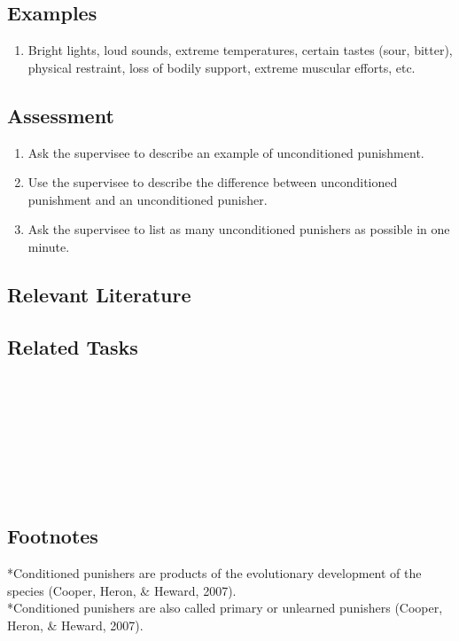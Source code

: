 \subsection{Examples}
\begin{enumerate}
\item Bright lights, loud sounds, extreme temperatures, certain tastes (sour, bitter), physical restraint, loss of bodily support, extreme muscular efforts, etc.
%
\end{enumerate}
%
\subsection{Assessment}
\begin{enumerate}
\item Ask the supervisee to describe an example of unconditioned punishment.
\item Use the supervisee to describe the difference between unconditioned punishment and an unconditioned punisher.
\item Ask the supervisee to list as many unconditioned punishers as possible in one minute.
%
\end{enumerate}
%
\subsection{Relevant Literature}
\begin{refsection}
\nocite{test,alang2017police,clayton2018black}
\printbibliography[heading=none]
\end{refsection} 
%         
%
%
%
%
%
%
\subsection{Related Tasks}
\fourdSeventeen{}\\
\fourdSixteen{}\\
\fourdNineteen{}\\
\foureEleven{}\\
\fourgSeven{}\\
\fourjTen{}\\
\fourFKTwenty{}\\
%
\subsection{Footnotes}
*Conditioned punishers are products of the evolutionary development of the species (Cooper, Heron, \& Heward, 2007).\\
*Conditioned punishers are also called primary or unlearned punishers (Cooper, Heron, \& Heward, 2007).\\
%
%
%
%
%
%
